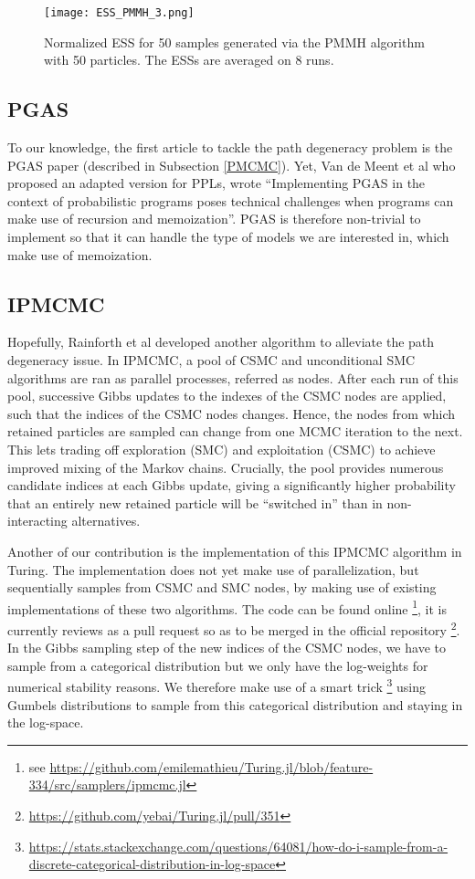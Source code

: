 \begin{figure}[h!]
\centering
\texttt{[image: ESS\_PMMH\_3.png]}
    \caption{Normalized \acrfull{ESS} for 50 samples generated via the PMMH algorithm with 50 particles. The \gls{ESS}s are averaged on 8 runs.}
    \label{fig:ESS_PMMH}
\end{figure}


\subsection{\acrlong{PGAS}}
To our knowledge, the first article to tackle the path degeneracy problem is the \gls{PGAS} paper \cite{Lindsten:2014uw} (described in Subsection \ref{PMCMC}).
Yet, Van de Meent et al \cite{vandeMeent:2015uk} who proposed an adapted version for \glspl{PPL}, wrote ``Implementing PGAS in the context of probabilistic programs poses technical challenges when programs can make use of recursion and memoization''. \gls{PGAS} is therefore non-trivial to implement so that it can handle the type of models we are interested in, which make use of memoization.

\subsection{\acrlong{IPMCMC}}
Hopefully, Rainforth et al \cite{Rainforth:2016wq} developed another algorithm to alleviate the path degeneracy issue.
In \gls{IPMCMC}, a pool of \gls{CSMC} and unconditional \gls{SMC} algorithms are ran as parallel processes, referred as nodes. After each run of this pool, successive Gibbs updates to the indexes of the \gls{CSMC} nodes are applied, such that the indices of the \gls{CSMC} nodes changes. Hence, the nodes from which retained particles are sampled can change from one MCMC iteration to the next. This lets trading off exploration (\gls{SMC}) and exploitation (\gls{CSMC}) to achieve improved mixing of the Markov chains. Crucially, the pool provides numerous candidate indices at each Gibbs update, giving a significantly higher probability that an entirely new retained particle will be “switched in” than in non-interacting alternatives.

Another of our contribution is the implementation of this \gls{IPMCMC} algorithm in Turing. The implementation does not yet make use of parallelization, but sequentially samples from \gls{CSMC} and \gls{SMC} nodes, by making use of existing implementations of these two algorithms.
The code can be found online \footnote{see \url{https://github.com/emilemathieu/Turing.jl/blob/feature-334/src/samplers/ipmcmc.jl}}, it is currently reviews as a pull request so as to be merged in the official repository \footnote{\url{https://github.com/yebai/Turing.jl/pull/351}}.
In the Gibbs sampling step of the new indices of the \gls{CSMC} nodes, we have to sample from a categorical distribution but we only have the log-weights for numerical stability reasons. We therefore make use of a smart trick \footnote{\url{https://stats.stackexchange.com/questions/64081/how-do-i-sample-from-a-discrete-categorical-distribution-in-log-space}} using Gumbels distributions to sample from this categorical distribution and staying in the log-space.

